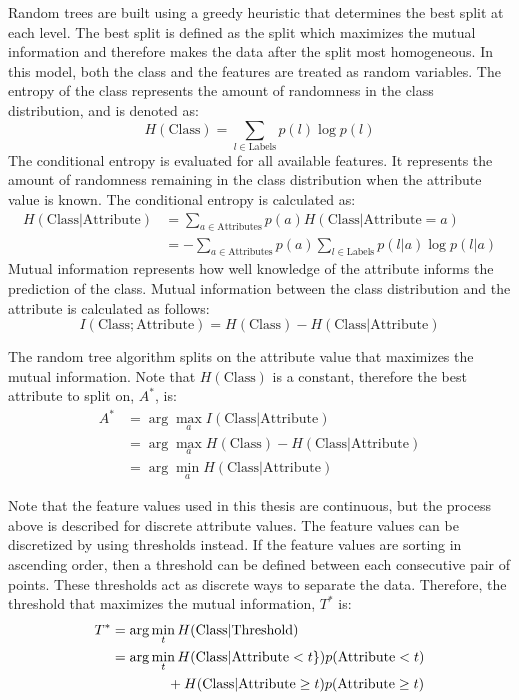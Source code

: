 \documentclass[12pt]{report}
\begin{document}
Random trees are built using a greedy heuristic that determines the best split at each level.
The best split is defined as the split which maximizes the mutual information and therefore makes the data after the split most homogeneous.
In this model, both the class and the features are treated as random variables.
The entropy of the class represents the amount of randomness in the class distribution, and is denoted as:
\begin{equation}
H(\text{Class})=\sum_{l\in \text{Labels}} p(l)\log p(l)
\end{equation}
The conditional entropy is evaluated for all available features.  
It represents the amount of randomness remaining in the class distribution when the attribute value is known.
The conditional entropy is calculated as:
\begin{align}
H(\text{Class}|\text{Attribute}) &= \sum_{a\in \text{Attributes}}p(a)H(\text{Class}|\text{Attribute}=a) \\
&=  -\sum_{a\in\text{Attributes}}p(a)\sum_{l\in\text{Labels}}p(l|a)\log p(l|a)
\end{align}
Mutual information represents how well knowledge of the attribute informs the prediction of the class.
Mutual information between the class distribution and the attribute is calculated as follows:
\begin{equation}
I(\text{Class}; \text{Attribute}) = H(\text{Class}) - H(\text{Class} | \text{Attribute})
\end{equation} \label{eq:info_gained}

The random tree algorithm splits on the attribute value that maximizes the mutual information.
Note that $H(\text{Class})$ is a constant, therefore the best attribute to split on, $A^*$, is:
\begin{align}
A^* &= \arg\max_a I(\text{Class}|\text{Attribute}) \\
&= \arg \max_a H(\text{Class})-H(\text{Class}|\text{Attribute})\\
&= \arg\min_a H(\text{Class}|\text{Attribute})
\end{align}

Note that the feature values used in this thesis are continuous, but the process above is described for discrete attribute values.
The feature values can be discretized by using thresholds instead.
If the feature values are sorting in ascending order, then a threshold can be defined between each consecutive pair of points.
These thresholds act as discrete ways to separate the data.
Therefore, the threshold that maximizes the mutual information, $T^*$ is:
\begin{align}
T^* &= \arg\min_t H(\text{Class}|\text{Threshold})\\
&= \arg\min_t H(\text{Class}|\text{Attribute}<t\})p(\text{Attribute}<t) \notag \\
 &\qquad \qquad + H(\text{Class}|\text{Attribute}\geq t)p(\text{Attribute}\geq t)
\end{align}
\end{document}
